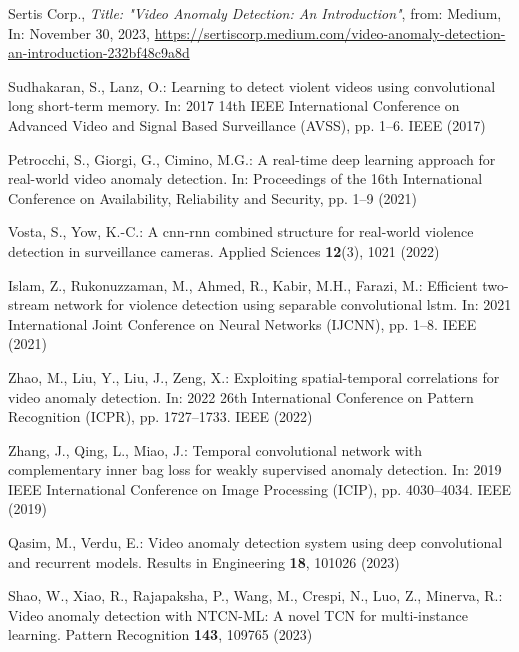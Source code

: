 \documentclass[runningheads]{llncs}
\begin{document}
%
%
% 
% 
%
\begin{thebibliography}{99}

Sertis Corp.,
\textit{Title: "Video Anomaly Detection: An Introduction"},
from: Medium,
In: November 30, 2023,
\url{https://sertiscorp.medium.com/video-anomaly-detection-an-introduction-232bf48c9a8d}

Sudhakaran, S., Lanz, O.: Learning to detect violent videos using convolutional long short-term memory. In: 2017 14th IEEE International Conference on Advanced Video and Signal Based Surveillance (AVSS), pp. 1--6. IEEE (2017)

Petrocchi, S., Giorgi, G., Cimino, M.G.: A real-time deep learning approach for real-world video anomaly detection. In: Proceedings of the 16th International Conference on Availability, Reliability and Security, pp. 1--9 (2021)

Vosta, S., Yow, K.-C.: A cnn-rnn combined structure for real-world violence detection in surveillance cameras. Applied Sciences \textbf{12}(3), 1021 (2022)

Islam, Z., Rukonuzzaman, M., Ahmed, R., Kabir, M.H., Farazi, M.: Efficient two-stream network for violence detection using separable convolutional lstm. In: 2021 International Joint Conference on Neural Networks (IJCNN), pp. 1--8. IEEE (2021)

Zhao, M., Liu, Y., Liu, J., Zeng, X.: Exploiting spatial-temporal correlations for video anomaly detection. In: 2022 26th International Conference on Pattern Recognition (ICPR), pp. 1727--1733. IEEE (2022)

Zhang, J., Qing, L., Miao, J.: Temporal convolutional network with complementary inner bag loss for weakly supervised anomaly detection. In: 2019 IEEE International Conference on Image Processing (ICIP), pp. 4030--4034. IEEE (2019)

Qasim, M., Verdu, E.: Video anomaly detection system using deep convolutional and recurrent models. Results in Engineering \textbf{18}, 101026 (2023)

Shao, W., Xiao, R., Rajapaksha, P., Wang, M., Crespi, N., Luo, Z., Minerva, R.: Video anomaly detection with NTCN-ML: A novel TCN for multi-instance learning. Pattern Recognition \textbf{143}, 109765 (2023)


\end{thebibliography}
\end{document}
